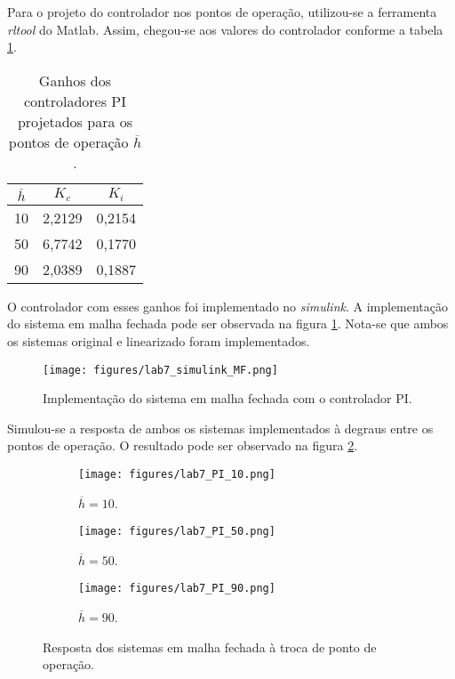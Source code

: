 \documentclass[a4paper]{report}
\begin{document}
Para o projeto do controlador nos pontos de operação, utilizou-se a ferramenta \emph{rltool} do Matlab. Assim, chegou-se aos valores do controlador conforme a tabela \ref{tab:ganhos-PI}.

\begin{table}[H]
    \centering
    \caption{Ganhos dos controladores PI projetados para os pontos de operação $\overline{h}$.}
    \label{tab:ganhos-PI}
    \begin{tabular}{c | c | c}
	$\overline{h}$ & $K_c$ & $K_i$ \\
	\hline 
	10 & 2,2129 & 0,2154 \\
	50 & 6,7742 & 0,1770 \\
	90 & 2,0389 & 0,1887
    \end{tabular}
\end{table}

O controlador com esses ganhos foi implementado no \emph{simulink}. A implementação do sistema em malha fechada pode ser observada na figura \ref{fig:figures-lab7_simulink_MF-png}. Nota-se que ambos os sistemas original e linearizado foram implementados.

\begin{figure}[H]
    \centering
    \texttt{[image: figures/lab7\_simulink\_MF.png]}
    \caption{Implementação do sistema em malha fechada com o controlador PI.}
    \label{fig:figures-lab7_simulink_MF-png}
\end{figure}

Simulou-se a resposta de ambos os sistemas implementados à degraus entre os pontos de operação. O resultado pode ser observado na figura \ref{fig:figures-lab4_1_resposta_simulink}.

\begin{figure}[H]
    \centering
    \begin{subfigure}{0.32\textwidth}
	\texttt{[image: figures/lab7\_PI\_10.png]}
	\caption{$\overline{h} = 10$.}
    \end{subfigure}
    \begin{subfigure}{0.32\textwidth}
	\texttt{[image: figures/lab7\_PI\_50.png]}
	\caption{$\overline{h} = 50$.}
    \end{subfigure}
    \begin{subfigure}{0.32\textwidth}
	\texttt{[image: figures/lab7\_PI\_90.png]}
	\caption{$\overline{h} = 90$.}
    \end{subfigure}
    \caption{Resposta dos sistemas em malha fechada à troca de ponto de operação.}
    \label{fig:figures-lab4_1_resposta_simulink}
\end{figure}
\end{document}
